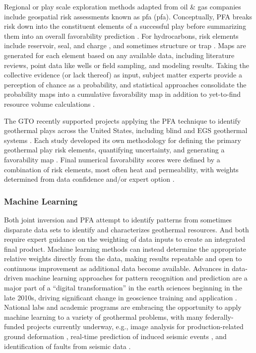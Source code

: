 Regional or play scale exploration methods adapted from oil \& gas companies include geospatial risk assessments known as \acrlong{pfa} (\acrshort{pfa}). Conceptually, PFA breaks risk down into the constituent elements of a successful play before summarizing them into an overall favorability prediction \citep{garchar_geothermal_2016}. For hydrocarbons, risk elements include reservoir, seal, and charge \citep{fraser_regional_2010}, and sometimes structure or trap \citep{doust_exploration_2010}. Maps are generated for each element based on any available data, including literature reviews, point data like wells or field sampling, and modeling results. Taking the collective evidence (or lack thereof) as input, subject matter experts provide a perception of chance as a probability, and statistical approaches consolidate the probability maps into a cumulative favorability map in addition to yet-to-find resource volume calculations \citep{lottaroli_evaluating_2018}.

The GTO recently supported projects applying the PFA technique to identify geothermal plays across the United States, including blind and EGS geothermal systems \citep{eeri_play_2014}. Each study developed its own methodology for defining the primary geothermal play risk elements, quantifying uncertainty, and generating a favorability map \citep{faulds_discovering_2019, jordan_low_2016, nash_phase_2017, wannamaker_structurally_2016}. Final numerical favorability scores were defined by a combination of risk elements, most often heat and permeability, with weights determined from data confidence and/or expert option \citep{garchar_geothermal_2016}.

\subsubsection{Machine Learning}\label{ch2:machine_learning}
Both joint inversion and PFA attempt to identify patterns from sometimes disparate data sets to identify and characterizes geothermal resources. And both require expert guidance on the weighting of data inputs to create an integrated final product. Machine learning methods can instead determine the appropriate relative weights directly from the data, making results repeatable and open to continuous improvement as additional data become available. Advances in data-driven machine learning approaches for pattern recognition and prediction are a major part of a ``digital transformation'' in the earth sciences beginning in the late 2010s, driving significant change in geoscience training and application \citep{gunderson_recent_2020}. National labs and academic programs are embracing the opportunity to apply machine learning to a variety of geothermal problems, with many federally-funded projects currently underway, e.g., image analysis for production-related ground deformation \citep{cavur_dinsar_2021}, real-time prediction of induced seismic events \citep{small_theory_2019}, and identification of faults from seismic data \citep{gao_delineating_2021}.

